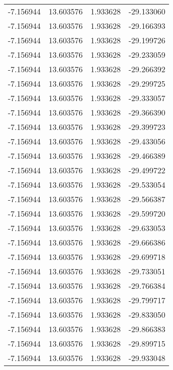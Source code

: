 \begin{tabular}{rrrr}
       -7.156944 &        13.603576 &    1.933628 & -29.133060 \\
       -7.156944 &        13.603576 &    1.933628 & -29.166393 \\
       -7.156944 &        13.603576 &    1.933628 & -29.199726 \\
       -7.156944 &        13.603576 &    1.933628 & -29.233059 \\
       -7.156944 &        13.603576 &    1.933628 & -29.266392 \\
       -7.156944 &        13.603576 &    1.933628 & -29.299725 \\
       -7.156944 &        13.603576 &    1.933628 & -29.333057 \\
       -7.156944 &        13.603576 &    1.933628 & -29.366390 \\
       -7.156944 &        13.603576 &    1.933628 & -29.399723 \\
       -7.156944 &        13.603576 &    1.933628 & -29.433056 \\
       -7.156944 &        13.603576 &    1.933628 & -29.466389 \\
       -7.156944 &        13.603576 &    1.933628 & -29.499722 \\
       -7.156944 &        13.603576 &    1.933628 & -29.533054 \\
       -7.156944 &        13.603576 &    1.933628 & -29.566387 \\
       -7.156944 &        13.603576 &    1.933628 & -29.599720 \\
       -7.156944 &        13.603576 &    1.933628 & -29.633053 \\
       -7.156944 &        13.603576 &    1.933628 & -29.666386 \\
       -7.156944 &        13.603576 &    1.933628 & -29.699718 \\
       -7.156944 &        13.603576 &    1.933628 & -29.733051 \\
       -7.156944 &        13.603576 &    1.933628 & -29.766384 \\
       -7.156944 &        13.603576 &    1.933628 & -29.799717 \\
       -7.156944 &        13.603576 &    1.933628 & -29.833050 \\
       -7.156944 &        13.603576 &    1.933628 & -29.866383 \\
       -7.156944 &        13.603576 &    1.933628 & -29.899715 \\
       -7.156944 &        13.603576 &    1.933628 & -29.933048 \\

\end{tabular}
